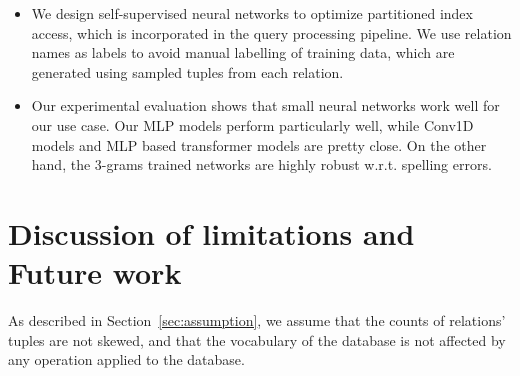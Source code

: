 \begin{itemize}
    \item We design self-supervised neural networks to optimize partitioned index access, which is incorporated in the query processing pipeline. We use relation names as labels to avoid manual labelling of training data, which are generated using sampled tuples from each relation. 
    
    \item Our experimental evaluation shows that small neural networks work well for our use case. Our MLP models perform particularly well, while Conv1D models and MLP based transformer models are pretty close. On the other hand, the 3-grams trained networks are highly robust w.r.t. spelling errors.
    
\end{itemize}


\section{Discussion of limitations and Future work}
\label{sec:limitation}
As described in Section~\ref{sec:assumption}, we assume that the counts of relations' tuples are not skewed, and that the vocabulary of the database is not affected by any operation applied to the database. 

